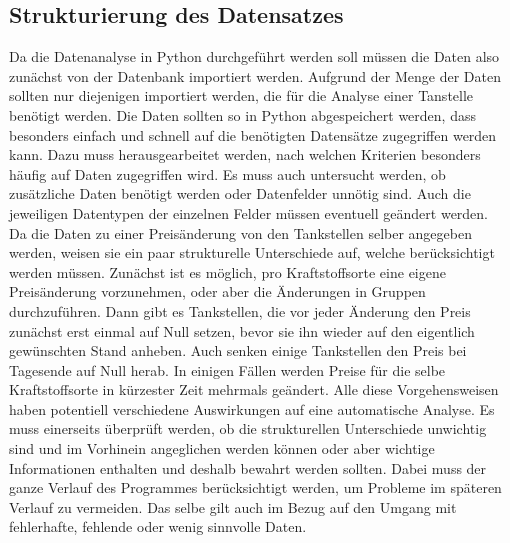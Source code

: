 \subsection{Strukturierung des Datensatzes}
Da die Datenanalyse in Python durchgeführt werden soll müssen die Daten also zunächst von der Datenbank importiert werden. Aufgrund der Menge der Daten sollten nur diejenigen importiert werden, die für die Analyse einer Tanstelle benötigt werden. Die Daten sollten so in Python abgespeichert werden, dass besonders einfach und schnell auf die benötigten Datensätze zugegriffen werden kann. Dazu muss herausgearbeitet werden, nach welchen Kriterien besonders häufig auf Daten zugegriffen wird. Es muss auch untersucht werden, ob zusätzliche Daten benötigt werden oder Datenfelder unnötig sind. Auch die jeweiligen Datentypen  der einzelnen Felder müssen eventuell geändert werden.\\
Da die Daten zu einer Preisänderung von den Tankstellen selber angegeben werden, weisen sie ein paar strukturelle Unterschiede auf, welche berücksichtigt werden müssen. Zunächst ist es möglich, pro Kraftstoffsorte eine eigene Preisänderung vorzunehmen, oder aber die Änderungen in Gruppen durchzuführen. Dann gibt es Tankstellen, die vor jeder Änderung den Preis zunächst erst einmal auf Null setzen, bevor sie ihn wieder auf den eigentlich gewünschten Stand anheben. Auch senken einige Tankstellen den Preis bei Tagesende auf Null herab. In einigen Fällen werden Preise für die selbe Kraftstoffsorte in kürzester Zeit mehrmals geändert. Alle diese Vorgehensweisen haben potentiell verschiedene Auswirkungen auf eine automatische Analyse. Es muss einerseits überprüft werden, ob die strukturellen Unterschiede unwichtig sind und im Vorhinein angeglichen werden können oder aber wichtige Informationen enthalten und deshalb bewahrt werden sollten. Dabei muss der ganze Verlauf des Programmes berücksichtigt werden, um Probleme im späteren Verlauf zu vermeiden. Das selbe gilt auch im Bezug auf den Umgang mit fehlerhafte, fehlende oder wenig sinnvolle Daten.\\

